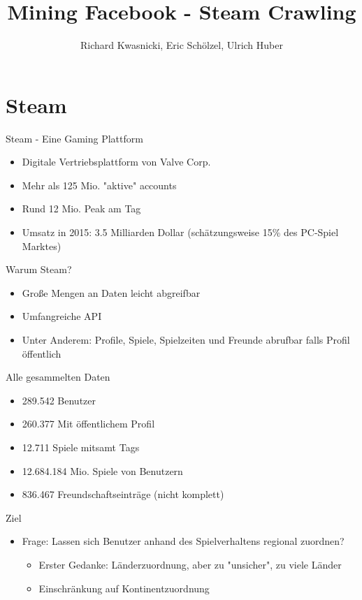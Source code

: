 \documentclass[12pt]{beamer}
\author{Richard Kwasnicki, Eric Schölzel, Ulrich Huber}
\title{Mining Facebook - Steam Crawling}
\begin{document}
\begin{frame}
\titlepage
\end{frame}


\section{Steam}
\begin{frame}{Steam - Eine Gaming Plattform}
\begin{itemize}
\item Digitale Vertriebsplattform von Valve Corp.
\item Mehr als 125 Mio. "aktive" accounts
\item Rund 12 Mio. Peak am Tag
\item Umsatz in 2015:  3.5 Milliarden Dollar (schätzungsweise 15\% des PC-Spiel Marktes)
\end{itemize}

\end{frame}

\begin{frame}{Warum Steam?}
\begin{itemize}
\item Große Mengen an Daten leicht abgreifbar
\item Umfangreiche API
\item Unter Anderem: Profile, Spiele, Spielzeiten und Freunde abrufbar falls Profil öffentlich 
\end{itemize}
\end{frame}

\begin{frame}{Alle gesammelten Daten}
\begin{itemize}
\item 289.542 Benutzer
\item 260.377 Mit öffentlichem Profil
\item 12.711 Spiele mitsamt Tags
\item 12.684.184 Mio. Spiele von Benutzern
\item 836.467 Freundschaftseinträge (nicht komplett)
\end{itemize}
\end{frame}

\begin{frame}{Ziel}
\begin{itemize}
\item Frage: Lassen sich Benutzer anhand des Spielverhaltens regional zuordnen?
\begin{itemize}
\item Erster Gedanke: Länderzuordnung, aber zu "unsicher", zu viele Länder
\item Einschränkung auf Kontinentzuordnung
\end{itemize}

\end{itemize}
\end{frame}
\end{document}
